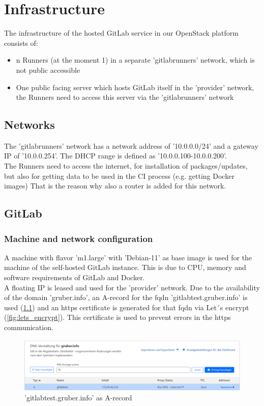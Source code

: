 \chapter{Infrastructure}

The infrastructure of the hosted GitLab service in our OpenStack platform consists of:
\begin{itemize}
    \item n Runners (at the moment 1) in a separate 'gitlabrunners' network, which is not public accessible
    \item One public facing server which hosts GitLab itself in the 'provider' network,
          the Runners need to access this server via the 'gitlabrunners' network
\end{itemize}

\section{Networks}

The 'gitlabrunners' network has a network address of '10.0.0.0/24' and a gateway IP of '10.0.0.254'.
The DHCP range is defined as '10.0.0.100-10.0.0.200'.\\

The Runners need to access the internet, for installation of packages/updates, but also for getting data to be used in the CI process (e.g. getting Docker images) 
That is the reason why also a router is added for this network.

\section{GitLab}

\subsection{Machine and network configuration}

A machine with flavor 'm1.large' with 'Debian-11' as base image is used for the machine of the self-hosted GitLab instance.
This is due to CPU, memory and software requirements of GitLab and Docker.\\

A floating IP is leased and used for the 'provider' network.
Due to the availability of the domain 'gruber.info', an A-record for the \ac{fqdn} 'gitlabtest.gruber.info' is used (\ref{fig:a_record}) and an https certificate is generated for that \ac{fqdn} via Let´s encrypt (\ref{fig:lets_encrypt}).
This certificate is used to prevent errors in the https communication.
\begin{figure}[H]
	\centering
	\includegraphics[width=14cm]{images/a-record.png}
	\caption{'gitlabtest.gruber.info' as A-record}
	\label{fig:a_record}
\end{figure}


